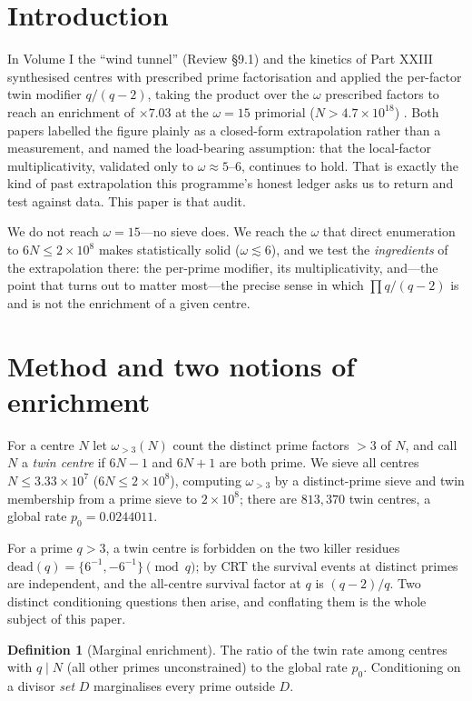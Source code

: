 \documentclass[11pt]{article}
\theoremstyle{definition}
\newtheorem{definition}{Definition}
\newcommand{\dead}{\mathrm{dead}}
\begin{document}
\section{Introduction}
In Volume I the ``wind tunnel'' (Review \S9.1) and the kinetics of Part XXIII synthesised centres
with prescribed prime factorisation and applied the per-factor twin modifier $q/(q-2)$, taking the
product over the $\omega$ prescribed factors to reach an enrichment of $\times7.03$ at the
$\omega=15$ primorial ($N>4.7\times10^{18}$) \cite{PXXIII,review}. Both papers labelled the figure
plainly as a closed-form extrapolation rather than a measurement, and named the load-bearing
assumption: that the local-factor multiplicativity, validated only to $\omega\approx5\text{--}6$,
continues to hold. That is exactly the kind of past extrapolation this programme's honest ledger
asks us to return and test against data. This paper is that audit.

We do not reach $\omega=15$---no sieve does. We reach the $\omega$ that direct enumeration to
$6N\le 2\times10^{8}$ makes statistically solid ($\omega\lesssim 6$), and we test the
\emph{ingredients} of the extrapolation there: the per-prime modifier, its multiplicativity, and---the
point that turns out to matter most---the precise sense in which $\prod q/(q-2)$ is and is not the
enrichment of a given centre.

\section{Method and two notions of enrichment}
For a centre $N$ let $\omega_{>3}(N)$ count the distinct prime factors $>3$ of $N$, and call $N$ a
\emph{twin centre} if $6N-1$ and $6N+1$ are both prime. We sieve all centres $N\le 3.33\times10^{7}$
($6N\le 2\times10^{8}$), computing $\omega_{>3}$ by a distinct-prime sieve and twin membership from a
prime sieve to $2\times10^{8}$; there are $813{,}370$ twin centres, a global rate
$p_0=0.0244011$.

For a prime $q>3$, a twin centre is forbidden on the two killer residues
$\dead(q)=\{6^{-1},-6^{-1}\}\pmod q$; by CRT the survival events at distinct primes are independent,
and the all-centre survival factor at $q$ is $(q-2)/q$. Two distinct conditioning questions then arise,
and conflating them is the whole subject of this paper.

\begin{definition}[Marginal enrichment]
The ratio of the twin rate among centres with $q\mid N$ (all other primes unconstrained) to the global
rate $p_0$. Conditioning on a divisor \emph{set} $D$ marginalises every prime outside $D$.
\end{definition}
\end{document}
